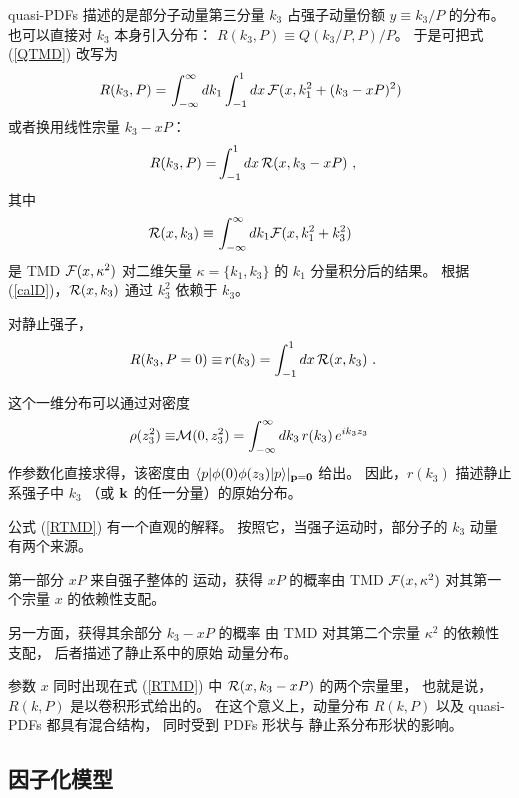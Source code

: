 quasi-PDFs 描述的是部分子动量第三分量 $k_3$ 占强子动量份额
$y \equiv k_3/P$ 的分布。
也可以直接对 $k_3$ 本身引入分布：
$R (k_3,P) \equiv Q(k_3/P,P)/P$。
于是可把式 (\ref{QTMD}) 改写为
\begin{align}
R(k_3, P)  =  & \,\int_{-\infty}^{\infty} d  k_1
\int_{-1} ^ {1} d  x \,   {\cal F} (x, k_1^2+(k_3-xP)^2 )
\
\label{RTMD0}
\end{align}
或者换用线性宗量 \mbox{$k_3-xP$：}
\begin{align}
R(k_3, P)  =  &  \int_{-1}^1 dx\,   {\cal R} (x, k_3-xP)
\  ,
\label{RTMD}
\end{align}
其中
\begin{align}
{\cal R} (x, k_3  )   \equiv   & \,\int_{-\infty}^{\infty} d  k_1
{\cal F} (x, k_1^2+k_3^2)
\
\label{calD}
\end{align}
是 TMD $ {\cal F} (x, \kappa^2)$ 对二维矢量
$\kappa=\{k_1,k_3\}$ 的 $k_1$ 分量积分后的结果。
根据 (\ref{calD})，${\cal R} (x, k_3  ) $ 通过 $k_3^2$ 依赖于 $k_3$。

对静止强子，
\begin{align}
R(k_3, P=0)  \equiv   &\, r(k_3)=
\int_{-1}^1 dx\,   {\cal R} (x, k_3  )
\  .
\label{DTMDsmall}
\end{align}

这个一维分布可以通过对密度
\begin{align}
\rho (z_3^2) \equiv & {\cal M} (0,z_3^2) =
\int_{-\infty}^{\infty}   dk_3 \,
r(k_3)  \,  e^{i k_3 z_3 } \,
\
\label{dk3}
\end{align}
作参数化直接求得，该密度由
$  \langle p |   \phi(0) \phi ( z_3 )|p \rangle |_{ {\bf p} = {\bf 0} } $ 给出。
因此，$r(k_3)$ 描述静止系强子中 $k_3$
（或 ${\bf k}$ 的任一分量）的原始分布。

公式 (\ref{RTMD}) 有一个直观的解释。
按照它，当强子运动时，部分子的 $k_3$ 动量
有两个来源。

第一部分 $xP$ 来自强子整体的
运动，获得 $xP$ 的概率由 TMD
${\cal F} (x, \kappa^2)$ 对其第一个宗量 $x$ 的依赖性支配。

另一方面，获得其余部分 $k_3-xP$ 的概率
由 TMD 对其第二个宗量 $\kappa^2$ 的依赖性支配，
后者描述了静止系中的原始
动量分布。

参数 $x$ 同时出现在式 (\ref{RTMD}) 中
${\cal R} (x, k_3-xP)$ 的两个宗量里，
也就是说，$R(k,P)$ 是以卷积形式给出的。
在这个意义上，动量分布 $R(k,P)$
以及 quasi-PDFs 都具有混合结构，
同时受到 PDFs 形状与
静止系分布形状的影响。

\subsection{因子化模型}

